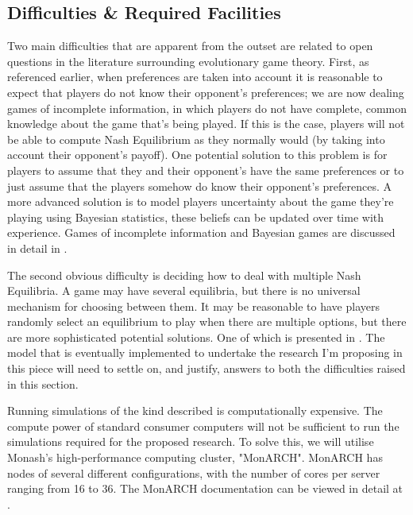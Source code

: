 \documentclass[11pt]{article}
\newcommand*{\np}{\par\noindent\newline}
\begin{document}
\subsection{Difficulties \& Required Facilities}
Two main difficulties that are apparent from the outset are related to open
questions in the literature surrounding evolutionary game theory. First, as
referenced earlier, when preferences are taken into account it is reasonable to
expect that players do not know their opponent's preferences; we are now
dealing games of incomplete information, in which players do not have complete,
common knowledge about the game that's being played. If this is the case, players will not be able to compute Nash Equilibrium as they normally
would (by taking into account their opponent's payoff). One potential solution
to this problem is for players to assume that they and their opponent's have
the same preferences or to just assume that the players somehow do know their
opponent's preferences. A more advanced solution is to model players
uncertainty about the game they're playing using Bayesian statistics, these
beliefs can be updated over time with experience. Games of incomplete
information and Bayesian games are discussed in detail in
\cite{shoham_multiagent_nodate}.
\np The second obvious difficulty is deciding how to deal with multiple Nash
Equilibria. A game may have several equilibria, but there is no universal
mechanism for choosing between them. It may be reasonable to have players
randomly select an equilibrium to play when there are multiple options, but
there are more sophisticated potential solutions. One of which is presented in
\cite{binmore_evolutionary_1999}. The model that is eventually implemented to
undertake the research I'm proposing in this piece will need to
settle on, and justify, answers to both the difficulties raised in this section.
\np Running simulations of the kind described is computationally expensive. The
compute power of standard consumer computers will not be sufficient to run the
simulations required for the proposed research. To solve this, we will utilise
Monash's high-performance computing cluster, "MonARCH". MonARCH has nodes of
several different configurations, with the number of cores per server ranging
from 16 to 36. The MonARCH documentation can be viewed in detail at
\cite{michnowicz_monarch_nodate}.
\pagebreak
\end{document}
